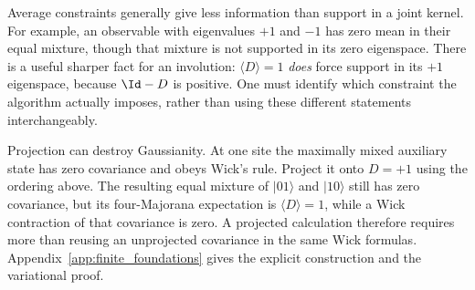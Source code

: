 Average constraints generally give less information than support in a joint
kernel. For example, an observable with eigenvalues $+1$ and $-1$ has zero mean
in their equal mixture, though that mixture is not supported in its zero
eigenspace. There is a useful sharper fact for an involution: $\langle D\rangle=1$
\emph{does} force support in its $+1$ eigenspace, because $\Id-D$ is positive.
One must identify which constraint the algorithm actually imposes, rather than
using these different statements interchangeably.

Projection can destroy Gaussianity. At one site the maximally mixed auxiliary
state has zero covariance and obeys Wick's rule. Project it onto $D=+1$ using
the ordering above. The resulting equal mixture of $|01\rangle$ and
$|10\rangle$ still has zero covariance, but its four-Majorana expectation is
$\langle D\rangle=1$, while a Wick contraction of that covariance is zero.
A projected calculation therefore requires more than reusing an unprojected
covariance in the same Wick formulas. Appendix~\ref{app:finite_foundations}
gives the explicit construction and the variational proof.
